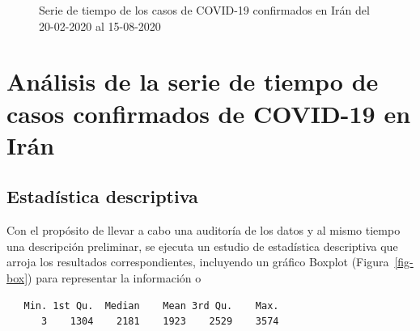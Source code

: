 \documentclass[
  us-letterpaper,
]{scrreprt}
\theoremstyle{definition}
\theoremstyle{plain}
\theoremstyle{plain}
\theoremstyle{definition}
\theoremstyle{remark}
\begin{document}
\begin{figure}


\caption{\label{fig-tspdf}Serie de tiempo de los casos de COVID-19
confirmados en Irán del 20-02-2020 al 15-08-2020}

\end{figure}%

\section{Análisis de la serie de tiempo de casos confirmados de COVID-19
en
Irán}\label{anuxe1lisis-de-la-serie-de-tiempo-de-casos-confirmados-de-covid-19-en-iruxe1n}

\subsection{Estadística descriptiva}\label{estaduxedstica-descriptiva}

Con el propósito de llevar a cabo una auditoría de los datos y al mismo
tiempo una descripción preliminar, se ejecuta un estudio de estadística
descriptiva que arroja los resultados correspondientes, incluyendo un
gráfico Boxplot (Figura~\ref{fig-box}) para representar la información o

\begin{verbatim}
   Min. 1st Qu.  Median    Mean 3rd Qu.    Max. 
      3    1304    2181    1923    2529    3574 
\end{verbatim}
\end{document}
